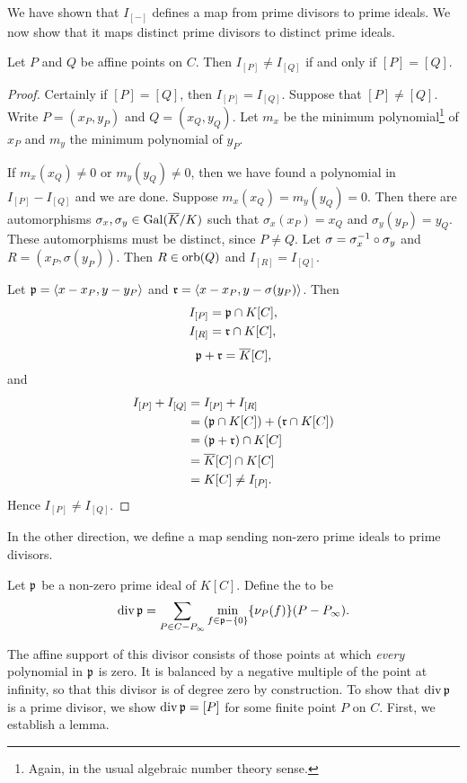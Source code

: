 We have shown that $I_{[-]}$ defines a map from prime divisors to prime ideals.
We now show that it maps distinct prime divisors to distinct prime ideals.
\begin{lemma}
  \label{lemma_orbs_and_ideals}
  Let $P$ and $Q$ be affine points on $C$.
  Then $I_{[P]} \neq I_{[Q]}$ if and only if $[P] = [Q]$.
\end{lemma}
\begin{proof}
  Certainly if $[P] = [Q]$, then $I_{[P]} = I_{[Q]}$.
  Suppose that $[P] \neq [Q]$.
  Write $P = (x_P, y_P)$ and $Q = (x_Q, y_Q)$.
  Let $m_x$ be the minimum polynomial\footnote{
  Again, in the usual algebraic number theory sense.}
  of $x_P$ and $m_y$ the minimum polynomial of $y_P$.
  
  If $m_x(x_Q) \neq 0$ or $m_y(y_Q) \neq 0$, then we have found a polynomial in $I_{[P]} - I_{[Q]}$ and we are done.
  Suppose $m_x(x_Q) = m_y(y_Q) = 0$.
  Then there are automorphisms $\sigma_x, \sigma_y \in \Gal(\bar K/K)$ such that
  $\sigma_x(x_P) = x_Q$ and $\sigma_y(y_P) = y_Q$.
  These automorphisms must be distinct, since $P \neq Q$.
  Let $\sigma = \sigma_x\inv \circ \sigma_y$ and $R = (x_P, \sigma(y_P))$.
  Then $R \in \orb(Q)$ and $I_{[R]} = I_{[Q]}$.

  Let $\frak p = \pid{x - x_P, y - y_P}$ and $\frak r = \pid{x - x_P, y - \sigma(y_P)}$. Then
  \begin{align*}
    I_{[P]} &= \frak p \cap K[C], \\
    I_{[R]} &= \frak r \cap K[C],
  \end{align*}
  \[ \frak p + \frak r = \bar K[C], \]
  and
  \begin{align*}
    I_{[P]} + I_{[Q]}
      &= I_{[P]} + I_{[R]} \\
      &= (\frak p \cap K[C]) + (\frak r \cap K[C]) \\
      &= (\frak p  + \frak r) \cap K[C] \\
      &= \bar K[C] \cap K[C] \\
      &= K[C] \neq I_{[P]}.
  \end{align*}
  Hence $I_{[P]} \neq I_{[Q]}$.
\end{proof}

In the other direction, we define a map sending non-zero prime ideals to prime divisors.
\begin{definition}
  \label{def_div_p}
  Let $\frak p$ be a non-zero prime ideal of $K[C]$.
  Define the  to be
  \[ \div \frak p = \sum_{P \in C - P_\infty} \min_{f \in \frak p - \{0\}}\{\nu_P(f)\}(P - P_\infty). \]
\end{definition}
The affine support of this divisor consists of those points at which \emph{every} polynomial in $\frak p$ is zero.
It is balanced by a negative multiple of the point at infinity,
so that this divisor is of degree zero by construction.
To show that $\div \frak p$ is a prime divisor,
we show $\div \frak p = [P]$ for some finite point $P$ on $C$.
First, we establish a lemma.

